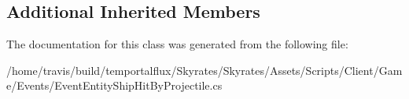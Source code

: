 \subsection*{Additional Inherited Members}


The documentation for this class was generated from the following file\-:\begin{DoxyCompactItemize}
\item 
/home/travis/build/temportalflux/\-Skyrates/\-Skyrates/\-Assets/\-Scripts/\-Client/\-Game/\-Events/Event\-Entity\-Ship\-Hit\-By\-Projectile.\-cs\end{DoxyCompactItemize}

